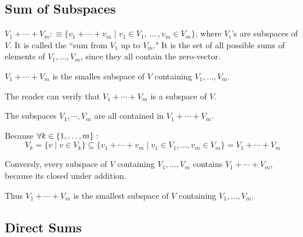 
\subsection{Sum of Subspaces}

\setcounter{thm}{35}
\begin{mydef}
  $V_1 + \cdots + V_m :\equiv \{v_1 + \cdots + v_m \mid v_1 \in V_1, \, \dots \, , v_m \in V_m \}$, where $V_i$'s are subspaces of $V$. It is called the ``sum from $V_1$ up to $V_m$." It is the set of all possible sums of elements of $V_1, \ldots, V_m$, since they all contain the zero-vector.
\end{mydef}

\setcounter{thm}{39}
\begin{thm}
  $V_1 + \cdots + V_m$ is the smalles subspace of $V$ containing $V_1, \dots, V_m.$
\end{thm}
\begin{prf}
  The reader can verify that $V_1 + \cdots + V_m$ is a subspace of $V$.
  
  The subspaces $V_1, \cdots, V_m$ are all contained in $V_1+\cdots+V_m$. 
  
  Because $\forall k \in \{1, \dots, m \}:$
  \begin{equation}
    V_k = \{ v \mid v \in V_k \} \subseteq \{v_1 + \cdots + v_m \mid v_1 \in V_1,  \ldots , v_m \in V_m \} = V_1 + \cdots + V_m
  \end{equation}
  
  Conversly, every subspace of $V$ containing $V_1, \ldots, V_m$ contains $V_1 + \cdots + V_m$, because its closed under addition.
  
  Thus $V_1 + \cdots + V_m$ is the smallest subspace of $V$ containing $V_1, \ldots, V_m$.
\end{prf}

\subsection{Direct Sums}

